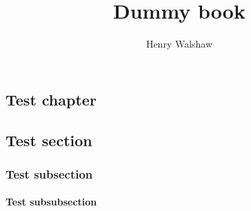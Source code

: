 \documentclass[9pt]{extbook}
\title{Dummy book}
\author{Henry Walshaw}
\begin{document}
\frontmatter

\begin{titlepage}
\maketitle
\end{titlepage}


\pagestyle{fancy}

\begin{multicols*}{2}
\tableofcontents

\mainmatter
{}
\chapter*{Test chapter}

\section*{Test section}

\subsection*{Test subsection}
\subsubsection*{Test subsubsection}


\end{multicols*}
\end{document}
